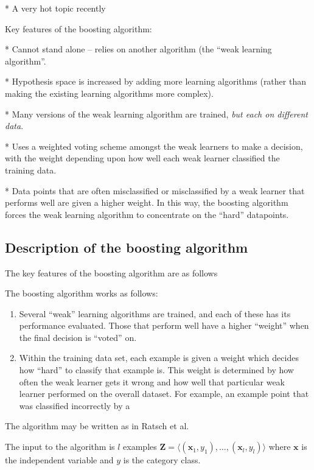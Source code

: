 * A very hot topic recently


Key features of the boosting algorithm:

* Cannot stand alone -- relies on another algorithm (the ``weak
  learning algorithm''.

* Hypothesis space is increased by adding more learning algorithms
  (rather than making the existing learning algorithms more complex).

* Many versions of the weak learning algorithm are trained, \emph{but
  each on different data}.

* Uses a weighted voting scheme amongst the weak learners to make a
  decision, with the weight depending upon how well each weak learner
  classified the training data.

* Data points that are often misclassified or misclassified by a weak
  learner that performs well are given a higher weight.  In this way,
  the boosting algorithm forces the weak learning algorithm to
  concentrate on the ``hard'' datapoints.


\subsection{Description of the boosting algorithm}



The key features of the boosting algorithm are as follows

The boosting algorithm works as follows:

\begin{enumerate}

\item	Several ``weak'' learning algorithms are trained, and each of
	these has its performance evaluated.  Those that perform well
	have a higher ``weight'' when the final decision is ``voted''
	on.

\item	Within the training data set, each example is given a weight
	which decides how ``hard'' to classify that example is.  This
	weight is determined by how often the weak learner gets it
	wrong and how well that particular weak learner performed on
	the overall dataset.  For example, an example point that was
	classified incorrectly by a 

\end{enumerate}

The algorithm may be written as in Ratsch et al. \cite{Ratsch98}

The input to the algorithm is $l$ examples $\mathbf{Z} = \langle
(\mathbf{x}_1, y_1), \ldots, (\mathbf{x}_l, y_l) \rangle$ where
$\mathbf{x}$ is the independent variable and $y$ is the category
class.

